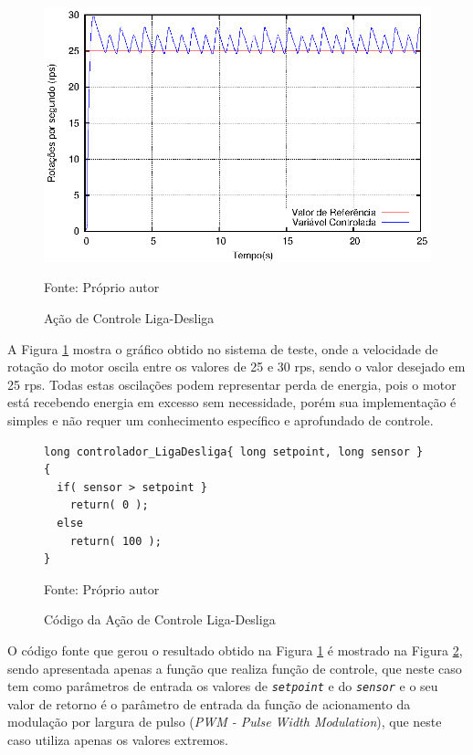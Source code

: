 \begin{figure}[!htb]
\centering
\caption{Ação de Controle Liga-Desliga}
\center\includegraphics[scale=1]{./imagens/acaoControle-ligaDesliga.eps}
\label{fig:acaoControleLigaDesliga}

{\small Fonte: Próprio autor}
\end{figure}

A Figura \ref{fig:acaoControleLigaDesliga} mostra o gráfico obtido no sistema de teste, onde a velocidade de rotação do motor oscila entre os valores de 25 e 30 rps, sendo o valor desejado em 25 rps. 
Todas estas oscilações podem representar perda de energia, pois o motor está recebendo energia em excesso sem necessidade, porém sua implementação é simples e não requer um conhecimento específico e aprofundado de controle.



\begin{figure}[!htb]
\centering
\caption{Código da Ação de Controle Liga-Desliga}
\begin{minipage}{0.8\linewidth}
\begin{lstlisting}
long controlador_LigaDesliga{ long setpoint, long sensor }
{
  if( sensor > setpoint }
    return( 0 );
  else
    return( 100 );
}
\end{lstlisting}
\end{minipage}
\label{fig:codigoAcaoLigaDesliga}

{\small Fonte: Próprio autor}
\end{figure}

O código fonte que gerou o resultado obtido na Figura \ref{fig:acaoControleLigaDesliga} é  mostrado na Figura \ref{fig:codigoAcaoLigaDesliga}, sendo apresentada apenas a função que realiza função de controle, que neste caso tem como parâmetros de entrada os valores de \textit{\texttt{setpoint}} e do \textit{\texttt{sensor}} e o seu valor de retorno é o parâmetro de entrada da função de acionamento da modulação por largura de pulso (\textit{PWM - Pulse Width Modulation}), que neste caso utiliza apenas os valores extremos.



